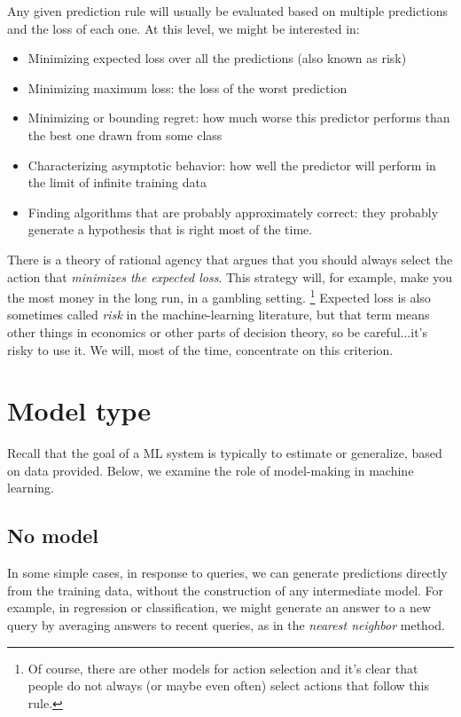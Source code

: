 \documentclass[11pt]{article}
\newcommand{\note}[1]{\todo[color=blue!10,
  linecolor=blue!90,size=\small]{\linespread{0.9}\selectfont{#1}\par}}
\renewcommand{\note}[1]{\footnote{#1}}
\begin{document}
Any given prediction rule will usually be evaluated based on multiple predictions and the loss of each one.  At this level, we might be interested in:
\begin{itemize}
\item Minimizing expected loss over all the predictions (also known as risk)
\item Minimizing maximum loss: the loss of the worst prediction
\item Minimizing or bounding regret: how much worse this predictor performs than the best one drawn from some class
\item Characterizing asymptotic behavior: how well the predictor will perform in the limit of infinite training data
\item Finding algorithms that are probably approximately correct:  they probably generate a hypothesis that is right most of the time.
\end{itemize}

There is a theory of rational agency that argues that you should
always select the action that {\em minimizes the expected loss}.  This
strategy will, for example, make you the most money in the long run,
in a gambling setting.  \note{Of course, there are other models for
  action selection and it's clear that people do not always (or maybe
  even often) select actions that follow this rule.}  Expected loss is
also sometimes called {\em risk} in the machine-learning literature,
but that term means other things in economics or other parts of
decision theory, so be careful...it's risky to use it.  We will, most of the time, concentrate on this criterion.


\section{Model type}

Recall that the goal of a ML system is typically to
estimate or generalize, based on data provided.  Below, we examine the
role of model-making in machine learning.

\subsection{No model}

In some simple cases, in response to queries, we can generate
predictions directly from the training data, without the construction
of any intermediate model.  For example, in regression or
classification, we might generate an answer to a new query by
averaging answers to recent queries, as in the {\em nearest neighbor}
method.
\end{document}
